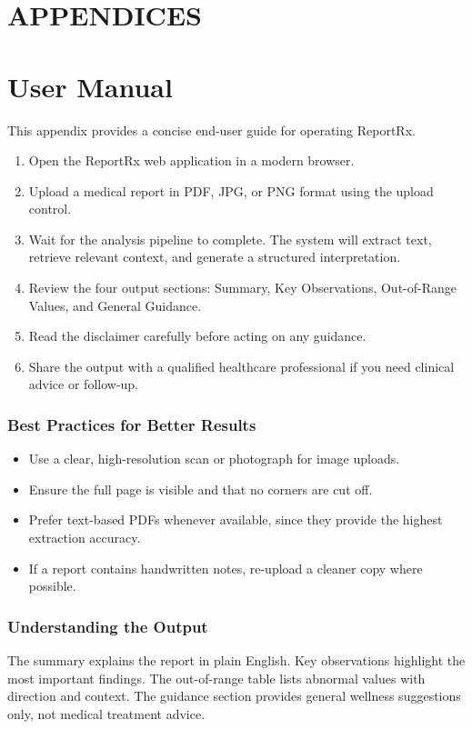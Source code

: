 \chapter*{APPENDICES}

\chapter{User Manual}
This appendix provides a concise end-user guide for operating ReportRx.

\begin{enumerate}
    \item Open the ReportRx web application in a modern browser.
    \item Upload a medical report in PDF, JPG, or PNG format using the upload control.
    \item Wait for the analysis pipeline to complete. The system will extract text, retrieve relevant context, and generate a structured interpretation.
    \item Review the four output sections: Summary, Key Observations, Out-of-Range Values, and General Guidance.
    \item Read the disclaimer carefully before acting on any guidance.
    \item Share the output with a qualified healthcare professional if you need clinical advice or follow-up.
\end{enumerate}

\subsection{Best Practices for Better Results}
\begin{itemize}
    \item Use a clear, high-resolution scan or photograph for image uploads.
    \item Ensure the full page is visible and that no corners are cut off.
    \item Prefer text-based PDFs whenever available, since they provide the highest extraction accuracy.
    \item If a report contains handwritten notes, re-upload a cleaner copy where possible.
\end{itemize}

\subsection{Understanding the Output}
The summary explains the report in plain English. Key observations highlight the most important findings. The out-of-range table lists abnormal values with direction and context. The guidance section provides general wellness suggestions only, not medical treatment advice.

